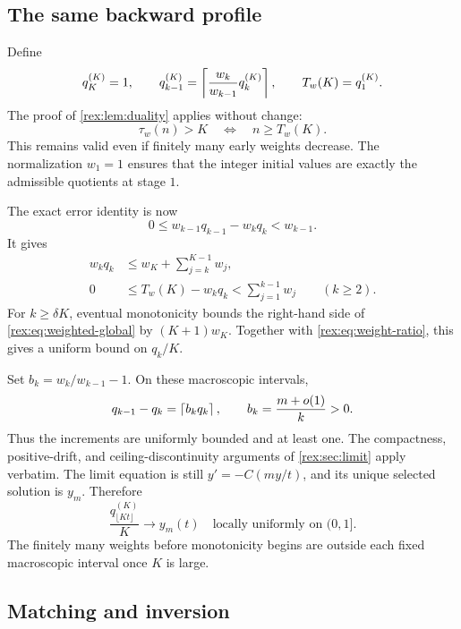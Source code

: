 \subsection{The same backward profile}

Define
\begin{equation}\label{rex:eq:weighted-backward}
 q_K^{(K)}=1,\qquad
 q_{k-1}^{(K)}=\left\lceil \frac{w_k}{w_{k-1}}q_k^{(K)}\right\rceil,\qquad
 T_w(K)=q_1^{(K)}.
\end{equation}
The proof of \cref{rex:lem:duality} applies without change:
\begin{equation}\label{rex:eq:weighted-duality}
 \tau_w(n)>K\quad\Longleftrightarrow\quad n\geq T_w(K).
\end{equation}
This remains valid even if finitely many early weights decrease. The
normalization $w_1=1$ ensures that the integer initial values are exactly
the admissible quotients at stage $1$.

The exact error identity is now
\begin{equation}\label{rex:eq:weighted-error-general}
 0\leq w_{k-1}q_{k-1}-w_kq_k<w_{k-1}.
\end{equation}
It gives
\begin{align}
 w_kq_k&\leq w_K+\sum_{j=k}^{K-1}w_j,
      \label{rex:eq:weighted-global}\\
 0&\leq T_w(K)-w_kq_k<\sum_{j=1}^{k-1}w_j
      \qquad(k\geq2).\label{rex:eq:weighted-tail}
\end{align}
For $k\geq\delta K$, eventual monotonicity bounds the right-hand side
of \cref{rex:eq:weighted-global} by $(K+1)w_K$. Together with
\cref{rex:eq:weight-ratio}, this gives a uniform bound on $q_k/K$.

Set $b_k=w_k/w_{k-1}-1$. On these macroscopic intervals,
\[
 q_{k-1}-q_k=\left\lceil b_kq_k\right\rceil,\qquad b_k=\frac{m+o(1)}k>0.
\]
Thus the increments are uniformly bounded and at least one. The
compactness, positive-drift, and ceiling-discontinuity arguments of
\cref{rex:sec:limit} apply verbatim. The limit equation is still
$y'=-C(my/t)$, and its unique selected solution is $y_m$. Therefore
\begin{equation}\label{rex:eq:weighted-profile}
 \frac{q_{\lfloor Kt\rfloor}^{(K)}}K\longrightarrow y_m(t)
 \quad\text{locally uniformly on }(0,1].
\end{equation}
The finitely many weights before monotonicity begins are outside each
fixed macroscopic interval once $K$ is large.

\subsection{Matching and inversion}

